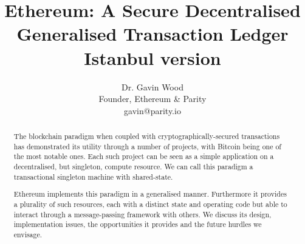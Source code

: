 \documentclass[9pt,oneside]{amsart}
\title[Ethereum: A Secure Decentralised Generalised Transaction Ledger\\ \smaller \textbf{{Istanbul version}}]{Ethereum: A Secure Decentralised Generalised Transaction Ledger \\ \smaller \textbf{{Istanbul version \YellowPaperVersionNumber}}}
\author{
    Dr. Gavin Wood\\
    Founder, Ethereum \& Parity\\
    gavin@parity.io
}
\begin{document}
\pagecolor{pagecolor}

\begin{abstract}
The blockchain paradigm when coupled with cryptographically-secured transactions has demonstrated its utility through a number of projects, with Bitcoin being one of the most notable ones. Each such project can be seen as a simple application on a decentralised, but singleton, compute resource. We can call this paradigm a transactional singleton machine with shared-state.

Ethereum implements this paradigm in a generalised manner. Furthermore it provides a plurality of such resources, each with a distinct state and operating code but able to interact through a message-passing framework with others. We discuss its design, implementation issues, the opportunities it provides and the future hurdles we envisage.
\end{abstract}

\maketitle
\end{document}
